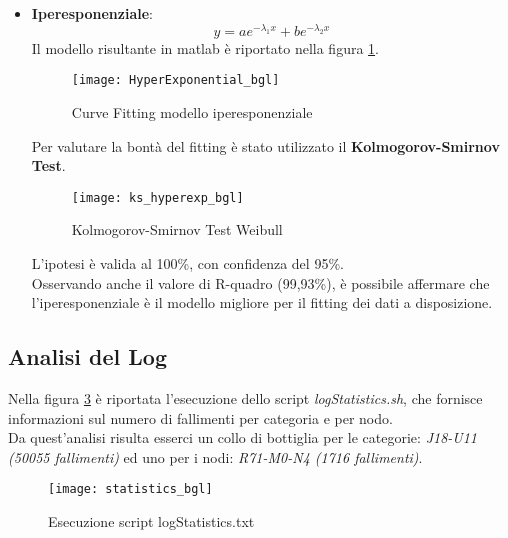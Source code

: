 \begin{itemize}
  \clearpage

  \item \textbf{Iperesponenziale}:
  $$ y = a e^{- \lambda_1  x} +  b  e^{- \lambda_2  x} $$
  Il modello risultante in matlab è riportato nella figura \ref{HyperExponential_bgl}.\\

  \begin{figure}[!htbp]
    \centering
    \texttt{[image: HyperExponential\_bgl]}
    \caption{Curve Fitting modello iperesponenziale}
    \label{HyperExponential_bgl}
  \end{figure}

  Per valutare la bontà del fitting è stato utilizzato il \textbf{Kolmogorov-Smirnov Test}.\\

  \begin{figure}[!htbp]
    \centering
    \texttt{[image: ks\_hyperexp\_bgl]}
    \caption{Kolmogorov-Smirnov Test Weibull}
    \label{ks_hyperexp_bgl}
  \end{figure}

  L'ipotesi è valida al 100\%, con confidenza del 95\%.\\
  Osservando anche il valore di R-quadro (99,93\%), è possibile affermare che
  l'iperesponenziale è il modello migliore per il fitting dei dati a disposizione.\\

  \clearpage
\end{itemize}

\clearpage

\subsection{Analisi del Log}
Nella figura \ref{statistics_bgl} è riportata l'esecuzione dello script
\textit{logStatistics.sh}, che fornisce informazioni sul numero di fallimenti
per categoria e per nodo.\\
Da quest'analisi risulta esserci un collo di bottiglia per le categorie:
\textit{J18-U11 (50055 fallimenti)} ed uno per i nodi: \textit{R71-M0-N4 (1716 fallimenti)}.\\

\begin{figure}[!htbp]
  \centering
  \texttt{[image: statistics\_bgl]}
  \caption{Esecuzione script logStatistics.txt}
  \label{statistics_bgl}
\end{figure}

